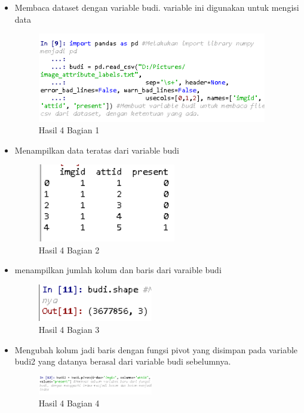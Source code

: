 \begin{itemize}
\item Membaca dataset dengan variable budi. variable ini digunakan untuk mengisi data

\begin{figure}[H]
\centerline{\includegraphics[width=10cm]{figures/1174089/3/praktek3.PNG}}
\caption{Hasil 4 Bagian 1}
\label{labelgambar}
\end{figure}

\item Menampilkan data teratas dari variable budi

\begin{figure}[H]
\centerline{\includegraphics[width=6cm]{figures/1174089/3/praktek4.PNG}}
\caption{Hasil 4 Bagian 2}
\label{labelgambar}
\end{figure}

\item menampilkan jumlah kolum dan baris dari varaible budi

\begin{figure}[H]
\centerline{\includegraphics[width=5cm]{figures/1174089/3/praktek5.PNG}}
\caption{Hasil 4 Bagian 3}
\label{labelgambar}
\end{figure}

\item Mengubah kolum jadi baris dengan fungsi pivot yang disimpan pada variable budi2 yang datanya berasal dari variable budi sebelumnya.

\begin{figure}[H]
\centerline{\includegraphics[width=5cm]{figures/1174089/3/praktek6.PNG}}
\caption{Hasil 4 Bagian 4}
\label{labelgambar}
\end{figure}


\end{itemize}
